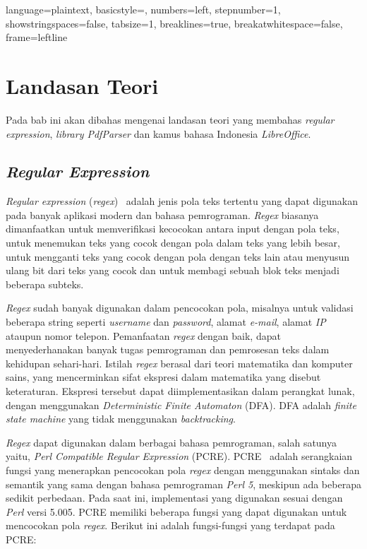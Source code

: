 
\lstset
{ 
    language=plaintext,
    basicstyle=\footnotesize,
    numbers=left,
    stepnumber=1,
    showstringspaces=false,
    tabsize=1,
    breaklines=true,
    breakatwhitespace=false,
    frame=leftline
}

\chapter{Landasan Teori}
\label{chap:teori}

Pada bab ini akan dibahas mengenai landasan teori yang membahas \textit{regular expression}, \textit{library PdfParser} dan kamus bahasa Indonesia \textit{LibreOffice}.

\section{\textit{Regular Expression}}
\label{sec:regex} 
 
\textit{Regular expression} (\textit{regex})~\cite{jan:12:cookbook} adalah jenis pola teks tertentu yang dapat digunakan pada banyak aplikasi modern dan bahasa pemrograman. \textit{Regex} biasanya dimanfaatkan untuk memverifikasi kecocokan antara input dengan pola teks, untuk menemukan teks yang cocok dengan pola dalam teks yang lebih besar, untuk mengganti teks yang cocok dengan pola dengan teks lain atau menyusun ulang bit dari teks yang cocok dan untuk membagi sebuah blok teks menjadi beberapa subteks.

\textit{Regex} sudah banyak digunakan dalam pencocokan pola, misalnya untuk validasi beberapa string seperti \textit{username} dan \textit{password}, alamat \textit{e-mail}, alamat \textit{IP} ataupun nomor telepon. Pemanfaatan \textit{regex} dengan baik, dapat menyederhanakan banyak tugas pemrograman dan pemrosesan teks dalam kehidupan sehari-hari. Istilah \textit{regex} berasal dari teori matematika dan komputer sains, yang mencerminkan sifat ekspresi dalam matematika yang disebut keteraturan. Ekspresi tersebut dapat diimplementasikan dalam perangkat lunak, dengan menggunakan \textit{Deterministic Finite Automaton} (DFA). DFA adalah \textit{finite state machine} yang tidak menggunakan \textit{backtracking}.

\textit{Regex} dapat digunakan dalam berbagai bahasa pemrograman, salah satunya yaitu, \textit{Perl Compatible Regular Expression} (PCRE). PCRE~\cite{pcre} adalah serangkaian fungsi yang menerapkan pencocokan pola \textit{regex} dengan menggunakan sintaks dan semantik yang sama dengan bahasa pemrograman \textit{Perl 5}, meskipun ada beberapa sedikit perbedaan. Pada saat ini, implementasi yang digunakan sesuai dengan \textit{Perl} versi 5.005. PCRE memiliki beberapa fungsi yang dapat digunakan untuk mencocokan pola \textit{regex}. Berikut ini adalah fungsi-fungsi yang terdapat pada PCRE:


